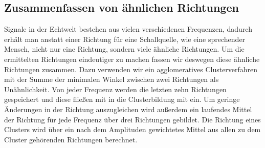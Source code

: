 \subsection{Zusammenfassen von ähnlichen Richtungen}
Signale in der Echtwelt bestehen aus vielen verschiedenen Frequenzen, dadurch erhält man anstatt einer Richtung für eine Schallquelle, wie eine sprechender Mensch, nicht nur eine Richtung, sondern viele ähnliche Richtungen. Um die ermittelten Richtungen eindeutiger zu machen fassen wir deswegen diese ähnliche Richtungen zusammen. Dazu verwenden wir ein agglomeratives Clusterverfahren mit der Summe der minimalen Winkel zwischen zwei Richtungen als Unähnlichkeit. Von jeder Frequenz werden die letzten zehn Richtungen gespeichert und diese fließen mit in die Clusterbildung mit ein. Um geringe Änderungen in der Richtung auszugleichen wird außerdem ein laufendes Mittel der Richtung für jede Frequenz über drei Richtungen gebildet. Die Richtung eines Clusters wird über ein nach dem Amplituden gewichtetes Mittel aus allen zu dem Cluster gehörenden Richtungen berechnet.